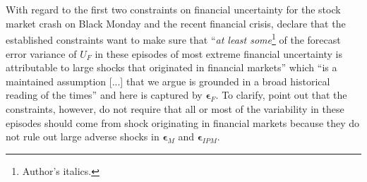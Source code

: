 \documentclass[a4paper,11pt,listof=nochaptergap,oneside,pointednumbers,bibtotoc,bigheadings,liststotoc]{scrbook}
\theoremstyle{mysatz}
\theoremstyle{mydefinition}
\theoremstyle{mybemerkung}
\newcommand{\vect}[1]{\boldsymbol{\mathbf{#1}}}
\begin{document}
\\
\\
With regard to the first two constraints on financial uncertainty for the stock market crash on Black Monday and the recent financial crisis, \citet{ludvigsonetal:18} declare that the established constraints want to make sure that ``\textit{at least some}\footnote{Author's italics.} of the forecast error variance of $U_F$ in these episodes of most extreme financial uncertainty is attributable to large shocks that originated in financial markets'' which ``is a maintained assumption [...] that we argue is grounded in a broad historical reading of the times'' \citep[p. 8]{ludvigsonetal:18} and here is captured by $\vect{\epsilon}_F$. To clarify, \citet{ludvigsonetal:18} point out that the constraints, however, do not require that all or most of the variability in these episodes should come from shock originating in financial markets because they do not rule out large adverse shocks in $\vect{\epsilon}_M$ and $\vect{\epsilon}_{IPM}$. 
\end{document}
